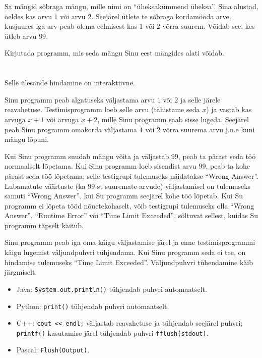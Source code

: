 \ifx\boi\undefined\fi
\def\version{jury-1}

Sa mängid sõbraga mängu, mille nimi on ``üheksakümmend üheksa''.
Sina alustad, öeldes kas arvu $1$ või arvu $2$.
Seejärel ütlete te sõbraga kordamööda arve, kusjuures iga arv peab olema eelmisest kas $1$ või $2$ võrra suurem.
Võidab see, kes ütleb arvu $99$.

Kirjutada programm, mis seda mängu Sinu eest mängides alati võidab.

\section*{\interactivity}
Selle ülesande hindamine on interaktiivne.

Sinu programm peab algatuseks väljastama arvu $1$ või $2$ ja selle järele reavahetuse.
Testimisprogramm loeb selle arvu (tähistame seda $x$) ja vastab kas arvuga $x+1$ või arvuga $x+2$, mille Sinu programm saab sisse lugeda.
Seejärel peab Sinu programm omakorda väljastama $1$ või $2$ võrra suurema arvu j.n.e kuni mängu lõpuni.

Kui Sinu programm suudab mängu võita ja väljastab $99$, peab ta pärast seda töö normaalselt lõpetama.
Kui Sinu programm loeb sisendist arvu $99$, peab ta kohe pärast seda töö lõpetama; selle testigrupi tulemuseks näidatakse ``Wrong Answer''.
Lubamatute väärtuste (ka $99$-st suuremate arvude) väljastamisel on tulemuseks samuti ``Wrong Answer'', kui Su programm seejärel kohe töö lõpetab.
Kui Su programm ei lõpeta tööd nõuetekohaselt, võib testigrupi tulemuseks olla ``Wrong Answer'', ``Runtime Error'' või ``Time Limit Exceeded'', sõltuvat sellest, kuidas Su programm täpselt käitub.

Sinu programm peab iga oma käigu väljastamise järel ja enne testimisprogrammi käigu lugemist väljundpuhvri tühjendama. Kui Sinu programm seda ei tee, on hindamise tulemuseks ``Time Limit Exceeded''. Väljundpuhvri tühendamine käib järgmiselt:
\begin{itemize}
  \item Java: \texttt{System.out.println()} tühjendab puhvri automaatselt.
  \item Python: \texttt{print()} tühjendab puhvri automaatselt.
  \item C++: \texttt{cout << endl;} väljastab reavahetuse ja tühjendab seejärel puhvri; \texttt{printf()} kasutamise järel tühjendab puhvri \texttt{fflush(stdout)}.
  \item Pascal: \texttt{Flush(Output)}.
\end{itemize}

